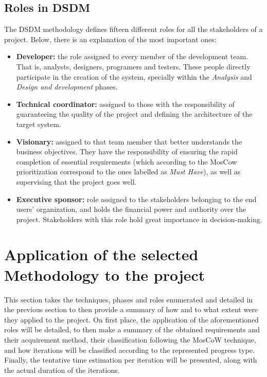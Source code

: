 \subsection{Roles in \acrshort{DSDM}}\label{sec:DSDMRoles}

The \acrshort{DSDM} methodology defines fifteen different roles for all the stakeholders of a project. Below, there is an explanation of the most important ones:

\begin{itemize}
    \item \textbf{Developer: }the role assigned to every member of the development team. That is, analysts, designers, programers and testers. These people directly participate
    in the creation of the system, specially within the \emph{Analysis} and \emph{Design and development} phases.
    
    \item \textbf{Technical coordinator: }assigned to those with the responsibility of guaranteeing the quality of the project and defining the architecture of the target
    system.
    
    \item \textbf{Visionary: }assigned to that team member that better understands the business objectives. They have the responsibility of ensuring the rapid completion of
    essential requirements (which according to the MosCow prioritization correspond to the ones labelled as \emph{Must Have}), as well as supervising that the project goes well.
    
    \item \textbf{Executive sponsor: }role assigned to the stakeholders belonging to the end users' organization, and holds the financial power and authority over the project. Stakeholders
    with this role hold great importance in decision-making.
\end{itemize}

\section{Application of the selected Methodology to the project}

This section takes the techniques, phases and roles enumerated and detailed in the previous section to then provide a summary of how and to what extent were they applied
to the project. On first place, the application of the aforementioned roles will be detailed, to then make a summary of the obtained requirements and their acquirement method,
their classification following the MosCoW technique, and how iterations will be classified according to the represented progress type. Finally, the tentative time estimation
per iteration will be presented, along with the actual duration of the iterations.


